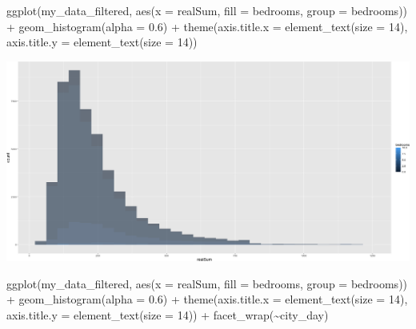 \documentclass[
]{article}
\newenvironment{Shaded}{\begin{snugshade}}{\end{snugshade}}
\newcommand{\AttributeTok}[1]{\textcolor[rgb]{0.77,0.63,0.00}{#1}}
\newcommand{\DecValTok}[1]{\textcolor[rgb]{0.00,0.00,0.81}{#1}}
\newcommand{\FloatTok}[1]{\textcolor[rgb]{0.00,0.00,0.81}{#1}}
\newcommand{\FunctionTok}[1]{\textcolor[rgb]{0.00,0.00,0.00}{#1}}
\newcommand{\NormalTok}[1]{#1}
\newcommand{\SpecialCharTok}[1]{\textcolor[rgb]{0.00,0.00,0.00}{#1}}
\begin{document}
\begin{Shaded}
\begin{Highlighting}[]
\FunctionTok{ggplot}\NormalTok{(my\_data\_filtered, }\FunctionTok{aes}\NormalTok{(}\AttributeTok{x =}\NormalTok{ realSum, }\AttributeTok{fill =}\NormalTok{ bedrooms, }\AttributeTok{group =}\NormalTok{ bedrooms)) }\SpecialCharTok{+}
    \FunctionTok{geom\_histogram}\NormalTok{(}\AttributeTok{alpha =} \FloatTok{0.6}\NormalTok{) }\SpecialCharTok{+} \FunctionTok{theme}\NormalTok{(}\AttributeTok{axis.title.x =} \FunctionTok{element\_text}\NormalTok{(}\AttributeTok{size =} \DecValTok{14}\NormalTok{),}
    \AttributeTok{axis.title.y =} \FunctionTok{element\_text}\NormalTok{(}\AttributeTok{size =} \DecValTok{14}\NormalTok{))}
\end{Highlighting}
\end{Shaded}

\includegraphics{Project_files/figure-latex/unnamed-chunk-25-2.png}

\begin{Shaded}
\begin{Highlighting}[]
\FunctionTok{ggplot}\NormalTok{(my\_data\_filtered, }\FunctionTok{aes}\NormalTok{(}\AttributeTok{x =}\NormalTok{ realSum, }\AttributeTok{fill =}\NormalTok{ bedrooms, }\AttributeTok{group =}\NormalTok{ bedrooms)) }\SpecialCharTok{+}
    \FunctionTok{geom\_histogram}\NormalTok{(}\AttributeTok{alpha =} \FloatTok{0.6}\NormalTok{) }\SpecialCharTok{+} \FunctionTok{theme}\NormalTok{(}\AttributeTok{axis.title.x =} \FunctionTok{element\_text}\NormalTok{(}\AttributeTok{size =} \DecValTok{14}\NormalTok{),}
    \AttributeTok{axis.title.y =} \FunctionTok{element\_text}\NormalTok{(}\AttributeTok{size =} \DecValTok{14}\NormalTok{)) }\SpecialCharTok{+} \FunctionTok{facet\_wrap}\NormalTok{(}\SpecialCharTok{\textasciitilde{}}\NormalTok{city\_day)}
\end{Highlighting}
\end{Shaded}
\end{document}
